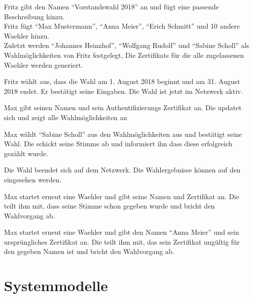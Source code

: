 \documentclass[parskip=full,11pt,twoside]{scrartcl}
\begin{document}
		{Fritz gibt den Namen \enquote{Vorstandswahl 2018} an und fügt eine passende Beschreibung hinzu.\\
		Fritz fügt \enquote{Max Mustermann}, \enquote{Anna Meier}, \enquote{Erich Schmitt} und 10 andere \gls{Waehler} hinzu.\\
		Zuletzt werden \enquote{Johannes Heinzhof}, \enquote{Wolfgang Rudolf} und \enquote{Sabine Scholl} als Wahlmöglichkeiten von Fritz festgelegt,}
		{Die \glspl{Zertifikat} für die alle zugelassenen \gls{Waehler} werden generiert.}	
	
\teststep{}
		{Fritz wählt aus, dass die \gls{Wahl} am 1. August 2018 beginnt und am 31. August 2018 endet. Er bestätigt seine Eingaben.}
		{Die \gls{Wahl} ist jetzt im \gls{Netzwerk} aktiv.}

		{Max gibt seinen Namen und sein Authentifizierungs \gls{Zertifikat} an.}
		{Die  updatet sich und zeigt alle Wahlmöglichkeiten an}
		
\teststep{}
		{Max wählt \enquote{Sabine Scholl} aus den Wahlmöglichkeiten aus und bestätigt seine Wahl.}
		{Die  schickt seine \gls{Stimme} ab und informiert ihn dass diese erfolgreich gezählt wurde.}
		
		{Die \gls{Wahl} beendet sich auf dem \gls{Netzwerk}.}
		{Die Wahlergebnisse können auf den  eingesehen werden.}
		
		{Max startet erneut eine \gls{Waehler}  und gibt seine Namen und \gls{Zertifikat} an.}
		{Die  teilt ihm mit, dass seine \gls{Stimme} schon gegeben wurde und bricht den Wahlvorgang ab.}

\teststep{}
		{Max startet erneut eine \gls{Waehler}  und gibt den Namen \enquote{Anna Meier} und sein ursprüngliches \gls{Zertifikat} an.}
		{Die  teilt ihm mit, das sein \gls{Zertifikat} ungültig für den gegeben Namen ist und bricht den Wahlvorgang ab.}

\section{Systemmodelle}
\end{document}
